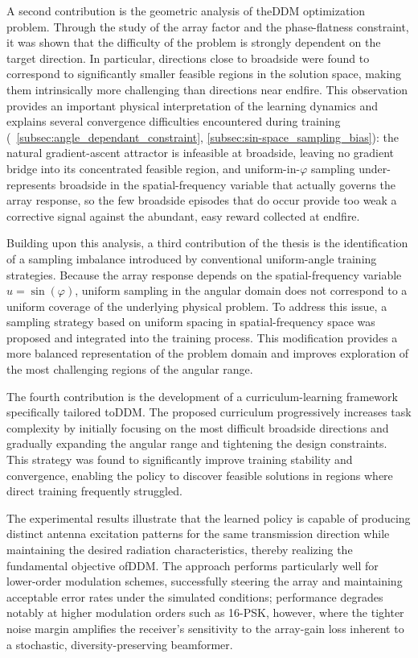 A second contribution is the geometric analysis of the\gls{DDM} optimization problem. Through the study of the array factor and the phase-flatness constraint, it was shown that the difficulty of the problem is strongly dependent on the target direction. In particular, directions close to broadside were found to correspond to significantly smaller feasible regions in the solution space, making them intrinsically more challenging than directions near endfire. This observation provides an important physical interpretation of the learning dynamics and explains several convergence difficulties encountered during training (\sectionname~\ref{subsec:angle_dependant_constraint}, \ref{subsec:sin-space_sampling_bias}): the natural gradient-ascent attractor is infeasible at broadside, leaving no gradient bridge into its concentrated feasible region, and uniform-in-$\varphi$ sampling under-represents broadside in the spatial-frequency variable that actually governs the array response, so the few broadside episodes that do occur provide too weak a corrective signal against the abundant, easy reward collected at endfire.

Building upon this analysis, a third contribution of the thesis is the identification of a sampling imbalance introduced by conventional uniform-angle training strategies. Because the array response depends on the spatial-frequency variable $u=\sin(\varphi)$, uniform sampling in the angular domain does not correspond to a uniform coverage of the underlying physical problem. To address this issue, a sampling strategy based on uniform spacing in spatial-frequency space was proposed and integrated into the training process. This modification provides a more balanced representation of the problem domain and improves exploration of the most challenging regions of the angular range.

The fourth contribution is the development of a curriculum-learning framework specifically tailored to\gls{DDM}. The proposed curriculum progressively increases task complexity by initially focusing on the most difficult broadside directions and gradually expanding the angular range and tightening the design constraints. This strategy was found to significantly improve training stability and convergence, enabling the policy to discover feasible solutions in regions where direct training frequently struggled.

The experimental results illustrate that the learned policy is capable of producing distinct antenna excitation patterns for the same transmission direction while maintaining the desired radiation characteristics, thereby realizing the fundamental objective of\gls{DDM}. The approach performs particularly well for lower-order modulation schemes, successfully steering the array and maintaining acceptable error rates under the simulated conditions; performance degrades notably at higher modulation orders such as 16-\gls{PSK}, however, where the tighter noise margin amplifies the receiver's sensitivity to the array-gain loss inherent to a stochastic, diversity-preserving beamformer.

